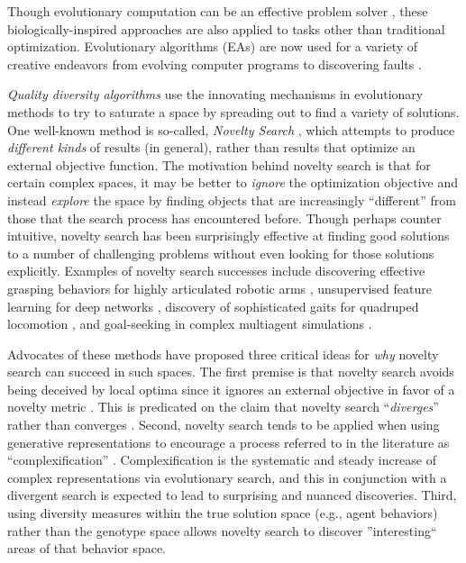 \documentclass[twoside]{article}
\begin{document}
Though evolutionary computation can be an effective problem solver \citep{ec:DeJong2006}, these biologically-inspired approaches are also applied to tasks other than traditional optimization.  Evolutionary algorithms (EAs) are now used for a variety of creative endeavors from evolving computer programs \citep{ec:LangdonPoli2002} to discovering faults \citep{HanesWiegand2019tor}.
 
\emph{Quality diversity algorithms} \citep{Fontaine2021corr,Choi2021gecco, FontainEtAl2020icog,Nordmoen2020corr,CullyDemiris2017corr,MouretClune2015preprint} use the innovating mechanisms in evolutionary methods to try to saturate a space by spreading out to find a variety of solutions. One well-known method is so-called, \emph{Novelty Search} \citep{StanleyLehman2015,Lehman2013gecco,LehmanStanley2011cec,LehmanStanley2008ssls}, which attempts to produce \emph{different kinds} of results (in general), rather than results that optimize an external objective function.  The motivation behind novelty search is that for certain complex spaces, it may be better to \emph{ignore} the optimization objective and instead \emph{explore} the space by finding objects that are increasingly ``different'' from those that the search process has encountered before.  Though perhaps counter intuitive, novelty search has been surprisingly effective at finding good solutions to a number of challenging problems without even looking for those solutions explicitly.  Examples of novelty search successes include discovering effective grasping behaviors for highly articulated robotic arms \citep{Huang2014cica}, unsupervised feature learning for deep networks \citep{Szerlip2015cai}, discovery of sophisticated gaits for quadruped locomotion \citep{Morse2013acgec}, and goal-seeking in complex multiagent simulations \citep{Lehman2011ecj}.

Advocates of these methods have proposed three critical ideas for \emph{why} novelty search can succeed in such spaces.  The first premise is that novelty search avoids being deceived by local optima since it ignores an external objective in favor of a novelty metric \citep{Lehman2011ecj}.  This is predicated on the claim that novelty search ``\emph{diverges}'' rather than converges \citet{Lehman2016frai,Lehman2015gecco,StanleyLehman2015}.  Second, novelty search tends to be applied when using generative representations \citep{LehmanStanley2008ssls} to encourage a process referred to in the literature as ``complexification'' \citep{StanleyMiikkulainen2004jair}.  Complexification is the systematic and steady increase of complex representations via evolutionary search, and this in conjunction with a divergent search is expected to lead to surprising and nuanced discoveries.  Third, using diversity measures within the true solution space (e.g., agent behaviors) rather than the genotype space allows novelty search to discover ''interesting`` areas of that behavior space.  
\end{document}
